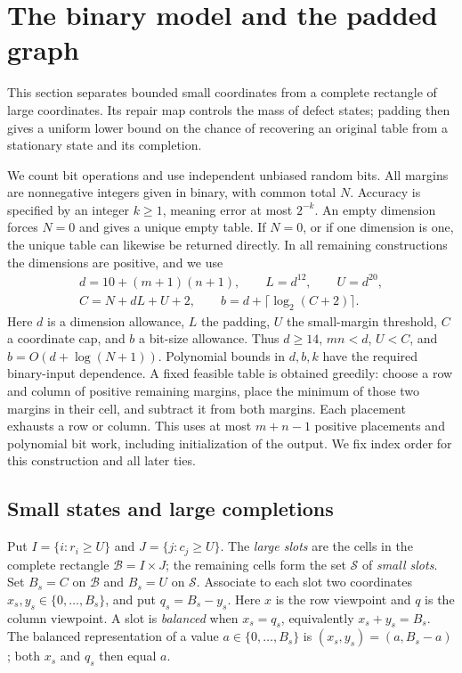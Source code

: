 \section{The binary model and the padded graph}\label{sec:graph}

This section separates bounded small coordinates from a complete rectangle
of large coordinates. Its repair map controls the mass of defect states;
padding then gives a uniform lower bound on the chance of recovering an
original table from a stationary state and its completion.

We count bit operations and use independent unbiased random bits.
All margins are nonnegative integers given in binary, with common total
$N$.  Accuracy is specified by an integer $k\ge1$, meaning error at most
$2^{-k}$.
An empty dimension forces $N=0$ and gives a unique empty table.
If $N=0$, or if one dimension is one, the unique table can likewise be
returned directly.  In all remaining constructions the dimensions are
positive, and we use
\begin{equation}\label{eq:parameters}
\begin{gathered}
 d=10+(m+1)(n+1),\qquad L=d^{12},\qquad U=d^{20},\\
 C=N+dL+U+2,\qquad b=d+\lceil\log_2(C+2)\rceil.
\end{gathered}
\end{equation}
Here $d$ is a dimension allowance, $L$ the padding, $U$ the small-margin
threshold, $C$ a coordinate cap, and $b$ a bit-size allowance.
Thus $d\ge14$, $mn<d$, $U<C$, and
$b=O(d+\log(N+1))$.  Polynomial bounds in $d,b,k$ have the required
binary-input dependence.  A fixed feasible table is obtained greedily:
choose a row and column of positive remaining margins, place the minimum
of those two margins in their cell, and subtract it from both margins.
Each placement exhausts a row or column.  This uses at most $m+n-1$
positive placements and polynomial bit work, including initialization of
the output.  We fix index order for this construction and all later ties.

\subsection{Small states and large completions}

Put $I=\{i:r_i\ge U\}$ and $J=\{j:c_j\ge U\}$.
The \emph{large slots} are the cells in the complete rectangle
$\mathcal B=I\times J$; the remaining cells form the set $\mathcal S$ of
\emph{small slots}.  Set $B_s=C$ on $\mathcal B$ and $B_s=U$ on
$\mathcal S$.  Associate to each slot two coordinates
$x_s,y_s\in\{0,\ldots,B_s\}$, and put $q_s=B_s-y_s$.
Here $x$ is the row viewpoint and $q$ is the column viewpoint.
A slot is \emph{balanced} when $x_s=q_s$, equivalently
$x_s+y_s=B_s$.
The balanced representation of a value $a\in\{0,\ldots,B_s\}$ is
$(x_s,y_s)=(a,B_s-a)$; both $x_s$ and $q_s$ then equal $a$.

